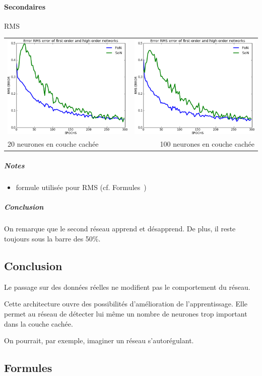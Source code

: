     \paragraph{Secondaires}
      RMS
      \begin{center}
	\begin{tabular}{lr}
	  \hspace*{-1cm}
	  \includegraphics[width=250px]{data/expC2/rms_20.png}
	  &
	  \includegraphics[width=250px]{data/expC2/rms_100.png} \\
	  
	  20 neurones en couche cachée
	  &
	  \hspace*{-1cm}
	  100 neurones en couche cachée
	\end{tabular}
      \end{center} 
      \subparagraph{Notes}
	\begin{itemize}
	  \item formule utilisée pour RMS (cf. Formules~)
	\end{itemize}
      \subparagraph{Conclusion}
	On remarque que le second réseau apprend et désapprend. De plus, il reste toujours sous la barre
	des 50\%.


  \subsection{Conclusion}
    Le passage sur des données réelles ne modifient pas le comportement du réseau.
    
    
    Cette architecture ouvre des possibilités d'amélioration de l'apprentissage.
    Elle permet au réseau de détecter lui même un nombre de neurones trop important dans la couche cachée.
  
    On pourrait, par exemple, imaginer un réseau s'autorégulant.
  

  \newpage 
  \subsection{Formules}
    
    
    


